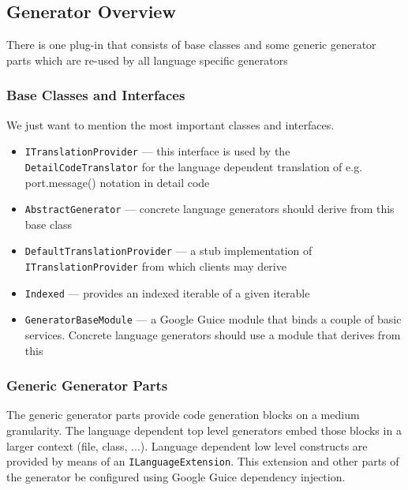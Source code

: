 \subsection{Generator Overview}

There is one plug-in that consists of base classes and some generic generator parts which are re-used by all language specific generators
 
\subsubsection{Base Classes and Interfaces}

We just want to mention the most important classes and interfaces.

\begin{itemize}
\item \begin{flushleft}\texttt{ITranslationProvider} --- this interface is used by the \texttt{DetailCodeTranslator} for the language dependent translation of e.g. port.message() notation in detail code\end{flushleft}
\item \texttt{AbstractGenerator} --- concrete language generators should derive from this base class
\item \begin{flushleft}\texttt{DefaultTranslationProvider} --- a stub implementation of \texttt{ITranslationProvider} from which clients may derive\end{flushleft}
\item \texttt{Indexed} --- provides an indexed iterable of a given iterable
\item \texttt{GeneratorBaseModule} --- a Google Guice module that binds a couple of basic services. Concrete language generators should use a module that derives from this
\end{itemize}

\subsubsection{Generic Generator Parts}

The generic generator parts provide code generation blocks on a medium granularity. The language dependent top level generators embed those blocks in a larger context (file, class, ...). Language dependent low level constructs are provided by means of an \texttt{ILanguageExtension}. This extension and other parts of the generator be configured using Google Guice dependency injection.

